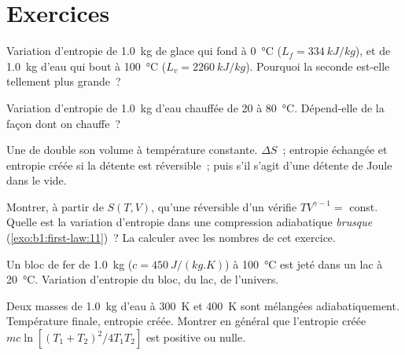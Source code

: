 \section{Exercices}

\begin{exercise}[$\star$]\label{exo:b1:second-law-entropy:1}
Variation d'entropie de \qty{1.0}{kg} de glace qui fond à \qty{0}{\degreeCelsius}
($L_f = \qty{334}{kJ/kg}$), et de \qty{1.0}{kg} d'eau qui bout à
\qty{100}{\degreeCelsius} ($L_v = \qty{2260}{kJ/kg}$). Pourquoi la seconde
est-elle tellement plus grande~?
\end{exercise}

\begin{exercise}[$\star$]\label{exo:b1:second-law-entropy:2}
Variation d'entropie de \qty{1.0}{kg} d'eau chauffée de \qty{20}{} à
\qty{80}{\degreeCelsius}. Dépend-elle de la façon dont on chauffe~?
\end{exercise}

\begin{exercise}[$\star$]\label{exo:b1:second-law-entropy:3}
Une  de  double son volume à température constante.
$\Delta S$~; entropie échangée et entropie créée si la détente est
réversible~; puis s'il s'agit d'une détente de Joule dans le vide.
\end{exercise}

\begin{exercise}[$\star$]\label{exo:b1:second-law-entropy:4}
Montrer, à partir de $S(T, V)$, qu'une 
réversible d'un  vérifie $TV^{\gamma - 1} = $ const. Quelle est la
variation d'entropie dans une compression adiabatique \emph{brusque}
(\cref{exo:b1:first-law:11})~? La calculer avec les nombres de cet exercice.
\end{exercise}

\begin{exercise}[$\star\star$]\label{exo:b1:second-law-entropy:5}
Un bloc de fer de \qty{1.0}{kg} ($c = \qty{450}{J/(kg.K)}$) à \qty{100}{\degreeCelsius}
est jeté dans un lac à \qty{20}{\degreeCelsius}. Variation d'entropie du
bloc, du lac, de l'univers.
\end{exercise}

\begin{exercise}[$\star\star$]\label{exo:b1:second-law-entropy:6}
Deux masses de \qty{1.0}{kg} d'eau à \qty{300}{K} et \qty{400}{K} sont
mélangées adiabatiquement. Température finale, entropie créée. Montrer en
général que l'entropie créée $mc\ln[(T_1 + T_2)^2/4T_1T_2]$ est positive ou nulle.
\end{exercise}

